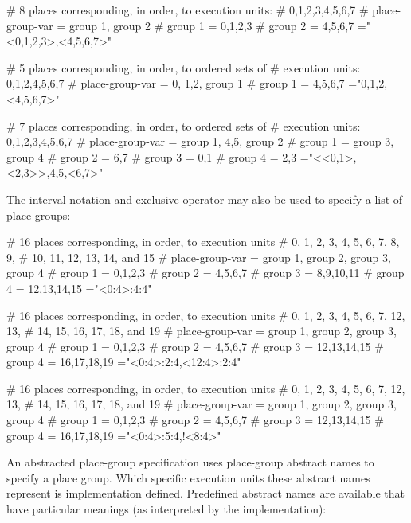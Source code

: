 \begin{boxeducode}
# 8 places corresponding, in order, to execution units:
# 0,1,2,3,4,5,6,7
# place-group-var = group 1, group 2
#         group 1 = 0,1,2,3
#         group 2 = 4,5,6,7
="<0,1,2,3>,<4,5,6,7>"

# 5 places corresponding, in order, to ordered sets of
# execution units: {0},{1,2},{4},{5},{6,7}
# place-group-var = 0, {1,2}, group 1
#         group 1 = 4,5,{6,7}
="0,{1,2},<4,5,{6,7}>"

# 7 places corresponding, in order, to ordered sets of
# execution units: {0},{1},{2},{3},{4,5},{6},{7}
# place-group-var = group 1, {4,5}, group 2
#         group 1 = group 3, group 4
#         group 2 = 6,7
#         group 3 = 0,1
#         group 4 = 2,3
="<<0,1>,<2,3>>,{4,5},<6,7>"
\end{boxeducode}

The interval notation and exclusive operator may also be used to specify a list
of place groups:

\begin{boxeducode}
# 16 places corresponding, in order, to execution units 
# 0, 1, 2, 3, 4, 5, 6, 7, 8, 9,
# 10, 11, 12, 13, 14, and 15
# place-group-var = group 1, group 2, group 3, group 4
#         group 1 = 0,1,2,3
#         group 2 = 4,5,6,7
#         group 3 = 8,9,10,11
#         group 4 = 12,13,14,15
="<0:4>:4:4"

# 16 places corresponding, in order, to execution units 
# 0, 1, 2, 3, 4, 5, 6, 7, 12, 13,
# 14, 15, 16, 17, 18, and 19
# place-group-var = group 1, group 2, group 3, group 4
#         group 1 = 0,1,2,3
#         group 2 = 4,5,6,7
#         group 3 = 12,13,14,15
#         group 4 = 16,17,18,19
="<0:4>:2:4,<12:4>:2:4"

# 16 places corresponding, in order, to execution units 
# 0, 1, 2, 3, 4, 5, 6, 7, 12, 13,
# 14, 15, 16, 17, 18, and 19
# place-group-var = group 1, group 2, group 3, group 4
#         group 1 = 0,1,2,3
#         group 2 = 4,5,6,7
#         group 3 = 12,13,14,15
#         group 4 = 16,17,18,19
="<0:4>:5:4,!<8:4>"
\end{boxeducode}

An abstracted place-group specification uses place-group abstract names to
specify a place group. Which specific execution units these abstract names
represent is implementation defined. Predefined abstract names are available
that have particular meanings (as interpreted by the implementation):

